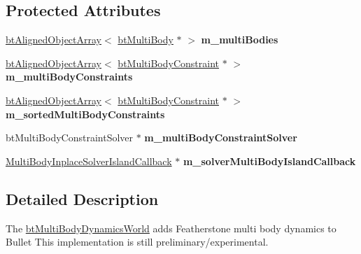 \subsection*{Protected Attributes}
\begin{DoxyCompactItemize}
\item 
\mbox{\label{classbtMultiBodyDynamicsWorld_ab793b73585ae10aac581488f28508232}} 
\hyperlink{classbtAlignedObjectArray}{bt\+Aligned\+Object\+Array}$<$ \hyperlink{classbtMultiBody}{bt\+Multi\+Body} $\ast$ $>$ {\bfseries m\+\_\+multi\+Bodies}
\item 
\mbox{\label{classbtMultiBodyDynamicsWorld_ad3a76563bf61e7b6123d21b469d7640a}} 
\hyperlink{classbtAlignedObjectArray}{bt\+Aligned\+Object\+Array}$<$ \hyperlink{classbtMultiBodyConstraint}{bt\+Multi\+Body\+Constraint} $\ast$ $>$ {\bfseries m\+\_\+multi\+Body\+Constraints}
\item 
\mbox{\label{classbtMultiBodyDynamicsWorld_ac4457a6e2d395507b35a1c11fa0aebfa}} 
\hyperlink{classbtAlignedObjectArray}{bt\+Aligned\+Object\+Array}$<$ \hyperlink{classbtMultiBodyConstraint}{bt\+Multi\+Body\+Constraint} $\ast$ $>$ {\bfseries m\+\_\+sorted\+Multi\+Body\+Constraints}
\item 
\mbox{\label{classbtMultiBodyDynamicsWorld_a2044c15050e99ea35cec3e9c66f57a94}} 
bt\+Multi\+Body\+Constraint\+Solver $\ast$ {\bfseries m\+\_\+multi\+Body\+Constraint\+Solver}
\item 
\mbox{\label{classbtMultiBodyDynamicsWorld_a1050131b90b7781ea3eda85f0f932a0a}} 
\hyperlink{structMultiBodyInplaceSolverIslandCallback}{Multi\+Body\+Inplace\+Solver\+Island\+Callback} $\ast$ {\bfseries m\+\_\+solver\+Multi\+Body\+Island\+Callback}
\end{DoxyCompactItemize}


\subsection{Detailed Description}
The \hyperlink{classbtMultiBodyDynamicsWorld}{bt\+Multi\+Body\+Dynamics\+World} adds Featherstone multi body dynamics to Bullet This implementation is still preliminary/experimental. 

